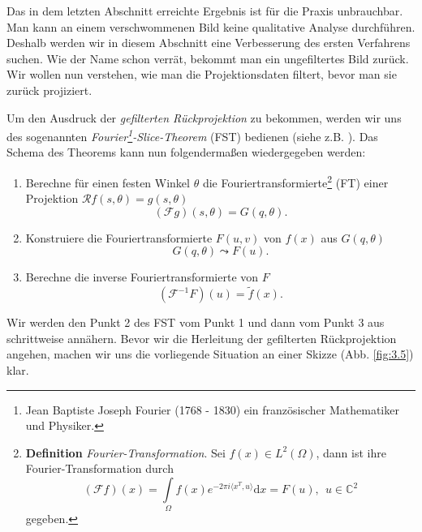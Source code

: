Das in dem letzten Abschnitt erreichte Ergebnis ist für die Praxis unbrauchbar. Man kann an einem verschwommenen Bild keine qualitative Analyse durchführen. Deshalb werden wir in diesem Abschnitt eine Verbesserung des ersten Verfahrens suchen. Wie der Name schon verrät, bekommt man ein ungefiltertes Bild zurück. Wir wollen nun verstehen, wie man die Projektionsdaten filtert, bevor man sie zurück projiziert.

Um den Ausdruck der \textit{gefilterten Rückprojektion} zu bekommen, werden wir uns des sogenannten \textit{Fourier\footnote{Jean Baptiste Joseph Fourier (1768 - 1830) ein französischer Mathematiker und Physiker.}-Slice-Theorem} (FST) bedienen (siehe z.B. \cite[S. 120]{Buzug04}). Das Schema des Theorems kann nun folgendermaßen wiedergegeben werden:
\begin{enumerate}
	\item Berechne für einen festen Winkel $\theta$ die Fouriertransformierte\footnote{
		\label{foot:14}\textbf{Definition }\textit{Fourier-Transformation}. Sei $f(x) \in L^2(\Omega)$, dann ist ihre Fourier-Transformation durch
			\begin{equation}
				(\mathcal{F}f)(x) = \int \limits_{\Omega} f(x) e^{-2\pi i \langle x^T, u \rangle} \mbox{d}x = F(u), \ \ u \in \mathbb{C}^2
				\label{equa:3.13}
			\end{equation}
		gegeben.} (FT) einer Projektion $\mathcal{R}f(s,\theta) = g(s,\theta)$
	\[(\mathcal{F}g)(s,\theta) = G(q, \theta). \]
	\item Konstruiere die Fouriertransformierte $F(u,v)$ von $f(x)$ aus $G(q,\theta)$
	\[G(q,\theta) \leadsto F(u).\]
	\item Berechne die inverse Fouriertransformierte von $F$
	\[(\mathcal{F}^{-1}F)(u) = \tilde{f}(x). \]
\end{enumerate}

Wir werden den Punkt 2 des FST vom Punkt 1 und dann vom Punkt 3 aus schrittweise annähern. Bevor wir die Herleitung der gefilterten Rückprojektion angehen, machen wir uns die vorliegende Situation an einer Skizze (Abb. \ref{fig:3.5}) klar. 

